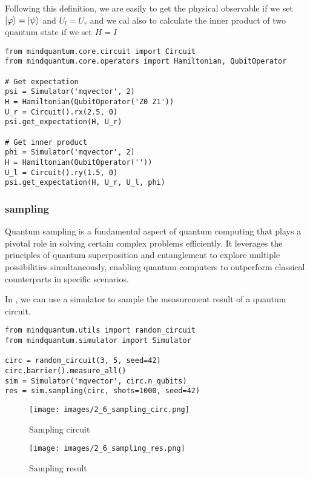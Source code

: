 Following this definition, we are easily to get the physical observable if we set $\ket{\varphi}=\ket{\psi}$ and $U_l = U_r$ and we cal also to calculate the inner product of two quantum state if we set $H=I$

\begin{lstlisting}
from mindquantum.core.circuit import Circuit
from mindquantum.core.operators import Hamiltonian, QubitOperator

# Get expectation
psi = Simulator('mqvector', 2)
H = Hamiltonian(QubitOperator('Z0 Z1'))
U_r = Circuit().rx(2.5, 0)
psi.get_expectation(H, U_r)

# Get inner product
phi = Simulator('mqvector', 2)
H = Hamiltonian(QubitOperator(''))
U_l = Circuit().ry(1.5, 0)
psi.get_expectation(H, U_r, U_l, phi)
\end{lstlisting}

\subsubsection{sampling}

Quantum sampling is a fundamental aspect of quantum computing that plays a pivotal role in solving certain complex problems efficiently. It leverages the principles of quantum superposition and entanglement to explore multiple possibilities simultaneously, enabling quantum computers to outperform classical counterparts in specific scenarios.

In \MindQuantum, we can use a simulator to sample the measurement result of a quantum circuit.
\begin{lstlisting}
from mindquantum.utils import random_circuit
from mindquantum.simulator import Simulator

circ = random_circuit(3, 5, seed=42)
circ.barrier().measure_all()
sim = Simulator('mqvector', circ.n_qubits)
res = sim.sampling(circ, shots=1000, seed=42)
\end{lstlisting}

\begin{figure}[h]
    \begin{center}
        \texttt{[image: images/2\_6\_sampling\_circ.png]}
    \end{center}
    \caption{Sampling circuit}
\end{figure}

\begin{figure}[h]
    \begin{center}
        \texttt{[image: images/2\_6\_sampling\_res.png]}
    \end{center}
    \caption{Sampling result}
\end{figure}

